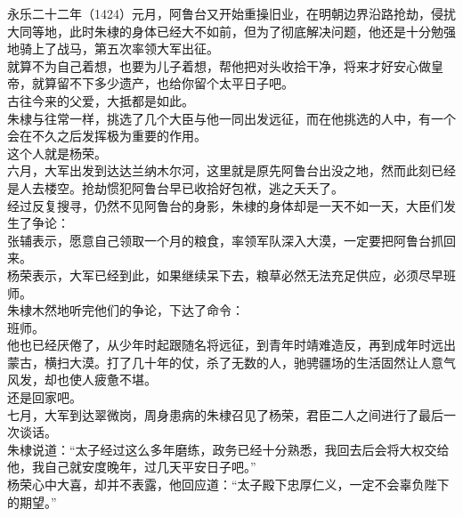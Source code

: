 \begin{multicols}{\theparacolNo}
永乐二十二年（1424）元月，阿鲁台又开始重操旧业，在明朝边界沿路抢劫，侵扰大同等地，此时朱棣的身体已经大不如前，但为了彻底解决问题，他还是十分勉强地骑上了战马，第五次率领大军出征。\\

就算不为自己着想，也要为儿子着想，帮他把对头收拾干净，将来才好安心做皇帝，就算留不下多少遗产，也给你留个太平日子吧。\\

古往今来的父爱，大抵都是如此。\\

朱棣与往常一样，挑选了几个大臣与他一同出发远征，而在他挑选的人中，有一个会在不久之后发挥极为重要的作用。\\

这个人就是杨荣。\\

六月，大军出发到达达兰纳木尔河，这里就是原先阿鲁台出没之地，然而此刻已经是人去楼空。抢劫惯犯阿鲁台早已收拾好包袱，逃之夭夭了。\\

经过反复搜寻，仍然不见阿鲁台的身影，朱棣的身体却是一天不如一天，大臣们发生了争论：\\

张辅表示，愿意自己领取一个月的粮食，率领军队深入大漠，一定要把阿鲁台抓回来。\\

杨荣表示，大军已经到此，如果继续呆下去，粮草必然无法充足供应，必须尽早班师。\\

朱棣木然地听完他们的争论，下达了命令：\\

班师。\\

他也已经厌倦了，从少年时起跟随名将远征，到青年时靖难造反，再到成年时远出蒙古，横扫大漠。打了几十年的仗，杀了无数的人，驰骋疆场的生活固然让人意气风发，却也使人疲惫不堪。\\

还是回家吧。\\

七月，大军到达翠微岗，周身患病的朱棣召见了杨荣，君臣二人之间进行了最后一次谈话。\\

朱棣说道：“太子经过这么多年磨练，政务已经十分熟悉，我回去后会将大权交给他，我自己就安度晚年，过几天平安日子吧。”\\

杨荣心中大喜，却并不表露，他回应道：“太子殿下忠厚仁义，一定不会辜负陛下的期望。”\\


\end{multicols}
